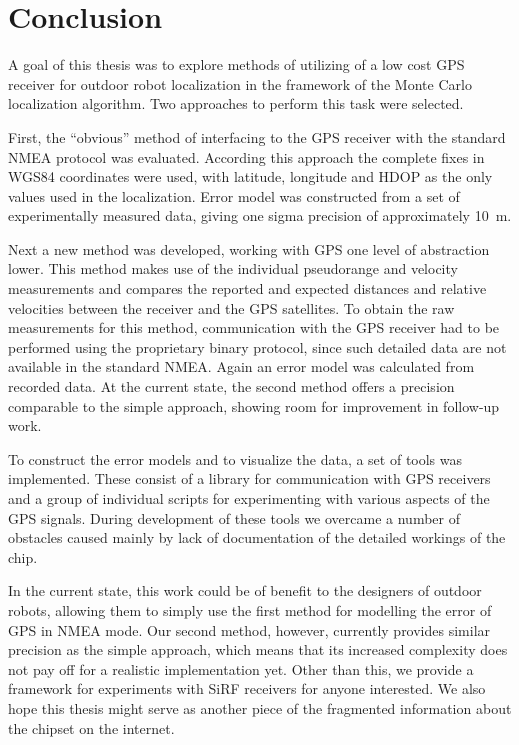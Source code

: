 \chapter{Conclusion}
\label{chap:conclusion}

A goal of this thesis was to explore methods of utilizing of a low cost GPS receiver
for outdoor robot localization in the framework of the Monte Carlo localization algorithm.
Two approaches to perform this task were selected.

First, the \enquote{obvious} method of interfacing to the GPS receiver with the
standard NMEA protocol was evaluated.
According this approach the complete fixes in WGS84 coordinates were used,
with latitude, longitude and HDOP as the only values used in the localization.
Error model was constructed from a set of experimentally measured data,
giving one sigma precision of approximately \SI{10}{\meter}.

Next a new method was developed, working with GPS one level of abstraction lower.
This method makes use of the individual pseudorange and velocity measurements
and compares the reported and expected distances and relative velocities between
the receiver and the GPS satellites.
To obtain the raw measurements for this method, communication with the GPS
receiver had to be performed using the proprietary binary protocol,
since such detailed data are not available in the standard NMEA.
Again an error model was calculated from recorded data.
At the current state, the second method offers a precision comparable to the simple
approach, showing room for improvement in follow-up work.

To construct the error models and to visualize the data, a set of tools was implemented.
These consist of a library for communication with \sirf GPS receivers
and a group of individual scripts for experimenting with various aspects of the GPS signals.
During development of these tools we overcame a number of obstacles caused mainly
by lack of documentation of the detailed workings of the \sirf chip.

In the current state, this work could be of benefit to the designers of
outdoor robots, allowing them to simply use the first method for modelling the
error of GPS in NMEA mode.
Our second method, however, currently provides similar precision as the simple
approach, which means that its increased complexity does not pay off for a realistic
implementation yet.
Other than this, we provide a framework for experiments with SiRF receivers
for anyone interested.
We also hope this thesis might serve as another piece of the fragmented
information about the \sirf chipset on the internet.
